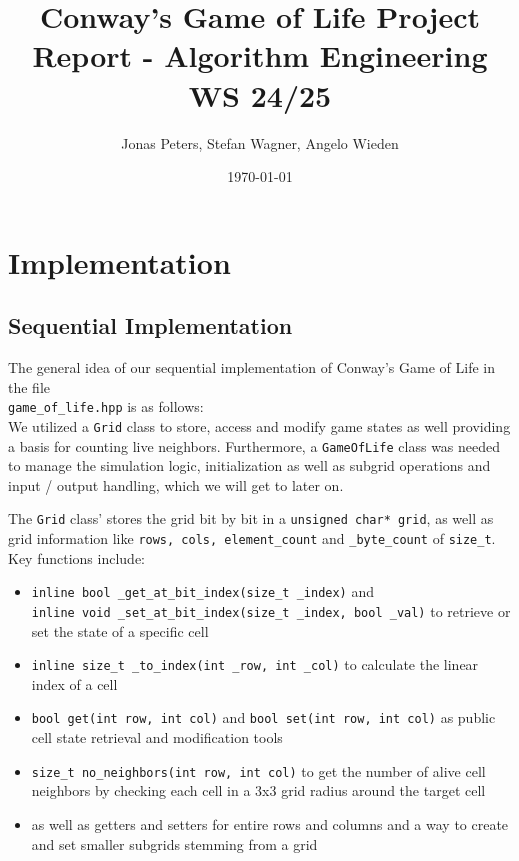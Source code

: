 \documentclass[11pt]{article}
\title{Conway's Game of Life Project Report - Algorithm Engineering WS 24/25}
\author{Jonas Peters, Stefan Wagner, Angelo Wieden}
\date{\today}
\begin{document}
\maketitle

\tableofcontents

\section{Implementation}

\subsection{Sequential Implementation}
The general idea of our sequential implementation of Conway's Game of Life in the file \\\texttt{game\_of\_life.hpp} is as follows: \\
We utilized a \texttt{Grid} class to store, access and modify game states as well providing a basis for counting live neighbors. Furthermore, a \texttt{GameOfLife} class was needed to manage the simulation logic, initialization as well as subgrid operations and input / output handling, which we will get to later on.

The \texttt{Grid} class' stores the grid bit by bit in a \texttt{unsigned char* grid}, as well as grid information like \texttt{rows, cols, element\_count} and \texttt{\_byte\_count} of \texttt{size\_t}. Key functions include: 
\begin{itemize}
    \item \texttt{inline bool \_get\_at\_bit\_index(size\_t \_index)} and \\\texttt{inline void \_set\_at\_bit\_index(size\_t \_index, bool \_val)} to retrieve or set the state of a specific cell
    \item \texttt{inline size\_t \_to\_index(int \_row, int \_col)} to calculate the linear index of a cell
    \item \texttt{bool get(int row, int col)} and \texttt{bool set(int row, int col)} as public cell state retrieval and modification tools
    \item \texttt{size\_t no\_neighbors(int row, int col)} to get the number of alive cell neighbors by checking each cell in a 3x3 grid radius around the target cell
    \item as well as getters and setters for entire rows and columns and a way to create and set smaller subgrids stemming from a grid 
\end{itemize}
\end{document}
